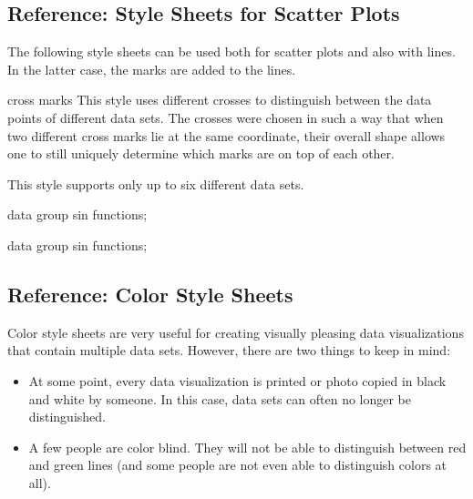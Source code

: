\subsection{Reference: Style Sheets for Scatter Plots}

The following style sheets can be used both for scatter plots and also
with lines. In the latter case, the marks are added to the lines.

\begin{stylesheet}{cross marks}
  This style uses different crosses to distinguish between the data
  points of different data sets. The crosses were chosen in such a way
  that when two different cross marks lie at the same coordinate,
  their overall shape allows one to still uniquely determine which
  marks are on top of each other.

  This style supports only up to six different data sets.
\begin{codeexample}[width=10cm]
\tikz \datavisualization [
  visualize as scatter/.list=
    {1,2,3,4,5,6,7,8},
  example visualization,
  style sheet=cross marks]
data group {sin functions};
\end{codeexample}
\begin{codeexample}[width=10cm]
\tikz \datavisualization [
  visualize as smooth line/.list=
    {1,2,3,4,5,6,7,8},
  example visualization,
  style sheet=cross marks]
data group {sin functions};
\end{codeexample}
\end{stylesheet}


\subsection{Reference: Color Style Sheets}

Color style sheets are very useful for creating visually pleasing data
visualizations that contain multiple data sets. However, there are two
things to keep in mind:

\begin{itemize}
\item At some point, every data visualization is printed or photo
  copied in black and white by someone. In this case, data sets can
  often no longer be distinguished.
\item A few people are color blind. They will not be able to
  distinguish between red and green lines (and some people are not
  even able to distinguish colors at all).
\end{itemize}

